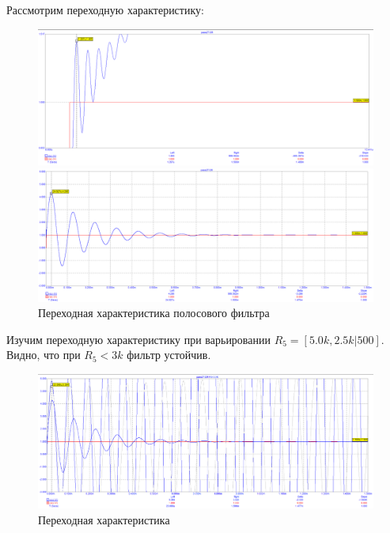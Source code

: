 \documentclass[12pt,a4paper]{article}
\begin{document}
	Рассмотрим переходную характеристику:
	\begin{figure}[H]
		\centering
		\begin{minipage}[b]{.5\textwidth}
			\includegraphics[width=1\linewidth]{res/pass2T_first.png}
		\end{minipage}%
		\begin{minipage}[b]{.5\textwidth}
			\includegraphics[width=1\linewidth]{res/pass2T_peak.png}
		\end{minipage}
		\caption{Переходная характеристика полосового фильтра}
	\end{figure}
	
	Изучим переходную характеристику при варьировании $R_5 = [5.0k, 2.5k | 500]$.
	Видно, что при $R_5 < 3k$ фильтр устойчив.
	\begin{figure}[H]
		\centering
		\includegraphics[width=1.0\linewidth]{res/pass2T_R5_transient.png}
		\caption{Переходная характеристика}
		\label{scheme}
	\end{figure}
	
\end{document}
